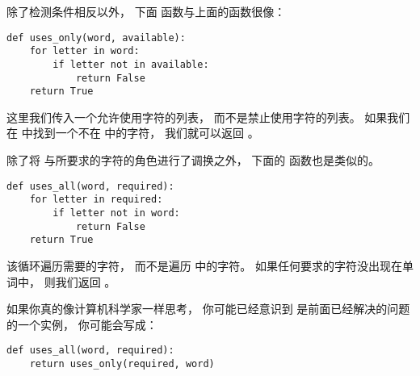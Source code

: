 除了检测条件相反以外， 下面  函数与上面的函数很像：

\begin{lstlisting}
def uses_only(word, available):
    for letter in word:
        if letter not in available:
            return False
    return True
\end{lstlisting}


这里我们传入一个允许使用字符的列表， 而不是禁止使用字符的列表。
如果我们在  中找到一个不在  中的字符， 我们就可以返回  。


除了将  与所要求的字符的角色进行了调换之外，
下面的  函数也是类似的。

\begin{lstlisting}
def uses_all(word, required):
    for letter in required:
        if letter not in word:
            return False
    return True
\end{lstlisting}


该循环遍历需要的字符， 而不是遍历  中的字符。  如果任何要求的字符没出现在单词中， 则我们返回  。



如果你真的像计算机科学家一样思考， 你可能已经意识到  是前面已经解决的问题的一个实例， 你可能会写成：

\begin{lstlisting}
def uses_all(word, required):
    return uses_only(required, word)
\end{lstlisting}


